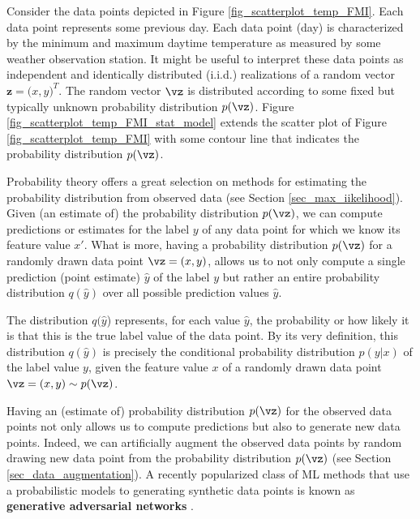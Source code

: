 \documentclass[12pt]{report}
\begin{document}
Consider the data points depicted in Figure \ref{fig_scatterplot_temp_FMI}. Each data point 
represents some previous day. Each data point (day) is characterized by the minimum and 
maximum daytime temperature as measured by some weather observation station. It might 
be useful to interpret these data points as independent and identically distributed (i.i.d.) 
realizations of a random vector $\mathbf{z} =\big(x,y\big)^{T}$. The random vector $\vz$ 
is distributed according to some fixed but typically unknown probability distribution $p(\vz)$. 
Figure \ref{fig_scatterplot_temp_FMI_stat_model} extends the scatter plot of Figure \ref{fig_scatterplot_temp_FMI} 
with some contour line that indicates the probability distribution $p(\vz)$. 

Probability theory offers a great selection on methods for estimating the probability 
distribution from observed data (see Section \ref{sec_max_iikelihood}). Given (an estimate of) 
the probability distribution $p(\vz)$, we can compute predictions 
or estimates for the label $y$ of any data point for which we 
know its feature value $x'$. What is more, having a probability 
distribution $p(\vz)$ for a randomly drawn data point $\vz=(x,y)$, 
allows us to not only compute a single prediction (point estimate) 
$\hat{y}$ of the label $y$ but rather an entire probability distribution 
$q(\hat{y})$ over all possible prediction values $\hat{y}$. 

The distribution $q(\hat{y}$) represents, for each value $\hat{y}$, the probability or how likely it 
is that this is the true label value of the data point. By its very definition, this distribution $q(\hat{y})$ 
is precisely the conditional probability distribution $p(y|x)$ of the label value $y$, given 
the feature value $x$ of a randomly drawn data point $\vz=(x,y) \sim p(\vz)$. 

Having an (estimate of) probability distribution $p(\vz)$ for the observed 
data points not only allows us to compute predictions but also to generate 
new data points. Indeed, we can artificially augment the observed data points 
by random drawing new data point from the probability distribution $p(\vz)$ 
(see Section \ref{sec_data_augmentation}). A recently popularized class of 
ML methods that use a probabilistic models to generating synthetic data points 
is known as {\bf generative adversarial networks} \cite{GoodfellowGAN}. 
\end{document}
